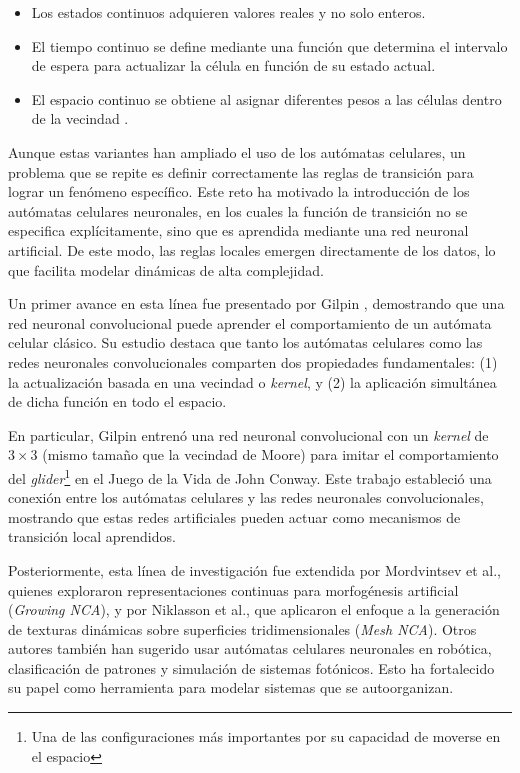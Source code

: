 \begin{itemize}
	\begin{itemize}
		
		\item Los estados continuos adquieren valores reales y no solo enteros.
		
		\item El tiempo continuo se define mediante una función que determina el intervalo de espera para actualizar la célula en función de su estado actual.
		
		\item El espacio continuo se obtiene al asignar diferentes pesos a las células dentro de la vecindad \cite{beckerCCA}.
		
	\end{itemize}
	
\end{itemize}

Aunque estas variantes han ampliado el uso de los autómatas celulares, un problema que se repite es definir correctamente las reglas de transición para lograr un fenómeno específico. Este reto ha motivado la introducción de los autómatas celulares neuronales, en los cuales la función de transición no se especifica explícitamente, sino que es aprendida mediante una red neuronal artificial. De este modo, las reglas locales emergen directamente de los datos, lo que facilita modelar dinámicas de alta complejidad.

Un primer avance en esta línea fue presentado por Gilpin \cite{gilpinNCA}, demostrando que una red neuronal convolucional puede aprender el comportamiento de un autómata celular clásico. Su estudio destaca que tanto los autómatas celulares como las redes neuronales convolucionales comparten dos propiedades fundamentales: (1) la actualización basada en una vecindad o \textit{kernel}, y (2) la aplicación simultánea de dicha función en todo el espacio.

En particular, Gilpin entrenó una red neuronal convolucional con un \textit{kernel} de $3 \times 3$ (mismo tamaño que la vecindad de Moore) para imitar el comportamiento del \textit{glider}\footnote{Una de las configuraciones más importantes por su capacidad de moverse en el espacio} en el Juego de la Vida de John Conway. Este trabajo estableció una conexión entre los autómatas celulares y las redes neuronales convolucionales, mostrando que estas redes artificiales pueden actuar como mecanismos de transición local aprendidos.

Posteriormente, esta línea de investigación fue extendida por Mordvintsev et al., quienes exploraron representaciones continuas para morfogénesis artificial (\textit{Growing NCA}), y por Niklasson et al., que aplicaron el enfoque a la generación de texturas dinámicas sobre superficies tridimensionales (\textit{Mesh NCA}). Otros autores también han sugerido usar autómatas celulares neuronales en robótica, clasificación de patrones y simulación de sistemas fotónicos. Esto ha fortalecido su papel como herramienta para modelar sistemas que se autoorganizan.